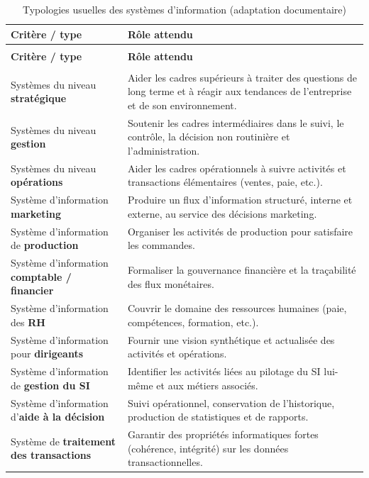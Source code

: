 \begingroup
\setlength{\tabcolsep}{5pt}
\renewcommand{\arraystretch}{1.15}
\small
\begin{longtable}{@{}>{\raggedright\arraybackslash}p{}>{\raggedright\arraybackslash}p{}@{}}
\caption{Typologies usuelles des systèmes d'information (adaptation documentaire)\label{tab:typosi}} \\
\toprule
\textbf{Critère / type} & \textbf{Rôle attendu} \\
\midrule
\endfirsthead
\multicolumn{2}{c}{\tablename\ \thetable{} — \textit{suite}} \\
\toprule
\textbf{Critère / type} & \textbf{Rôle attendu} \\
\midrule
\endhead
\midrule
\multicolumn{2}{r}{\textit{Suite page suivante}} \\
\endfoot
\bottomrule
\endlastfoot
Systèmes du niveau \textbf{stratégique} &
Aider les cadres supérieurs à traiter des questions de long terme et à réagir aux tendances
de l'entreprise et de son environnement. \\
Systèmes du niveau \textbf{gestion} &
Soutenir les cadres intermédiaires dans le suivi, le contrôle, la décision non routinière et
l'administration. \\
Systèmes du niveau \textbf{opérations} &
Aider les cadres opérationnels à suivre activités et transactions élémentaires (ventes, paie,
etc.). \\
Système d'information \textbf{marketing} &
Produire un flux d'information structuré, interne et externe, au service des décisions
marketing. \\
Système d'information de \textbf{production} &
Organiser les activités de production pour satisfaire les commandes. \\
Système d'information \textbf{comptable / financier} &
Formaliser la gouvernance financière et la traçabilité des flux monétaires. \\
Système d'information des \textbf{RH} &
Couvrir le domaine des ressources humaines (paie, compétences, formation, etc.). \\
Système d'information pour \textbf{dirigeants} &
Fournir une vision synthétique et actualisée des activités et opérations. \\
Système d'information de \textbf{gestion du SI} &
Identifier les activités liées au pilotage du SI lui-même et aux métiers associés. \\
Système d'information d'\textbf{aide à la décision} &
Suivi opérationnel, conservation de l'historique, production de statistiques et de rapports. \\
Système de \textbf{traitement des transactions} &
Garantir des propriétés informatiques fortes (cohérence, intégrité) sur les données
transactionnelles. \\
\end{longtable}
\endgroup

